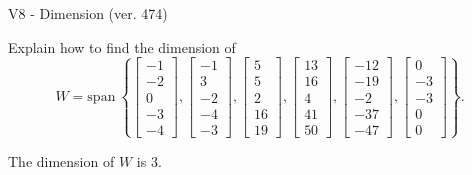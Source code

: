 \begin{exercise}
  \begin{exerciseTitle}V8 - Dimension (ver. 474)\end{exerciseTitle}
  \begin{exerciseStatement}
    Explain how to find the dimension of 
\[W=\mathrm{span}\ \left\{\left[\begin{array}{r}
-1 \\
-2 \\
0 \\
-3 \\
-4
\end{array}\right] , \left[\begin{array}{r}
-1 \\
3 \\
-2 \\
-4 \\
-3
\end{array}\right] , \left[\begin{array}{r}
5 \\
5 \\
2 \\
16 \\
19
\end{array}\right] , \left[\begin{array}{r}
13 \\
16 \\
4 \\
41 \\
50
\end{array}\right] , \left[\begin{array}{r}
-12 \\
-19 \\
-2 \\
-37 \\
-47
\end{array}\right] , \left[\begin{array}{r}
0 \\
-3 \\
-3 \\
0 \\
0
\end{array}\right]\right\}.\]



  \end{exerciseStatement}
  \begin{exerciseAnswer}
   The dimension of \(W\) is  \(3\).
  


  \end{exerciseAnswer}
\end{exercise}
